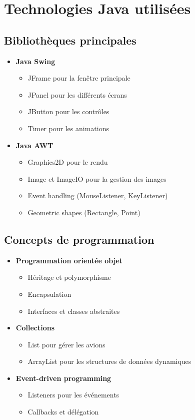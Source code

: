 \documentclass[12pt,a4paper]{article}
\begin{document}
\section{Technologies Java utilisées}

\subsection{Bibliothèques principales}
\begin{itemize}
    \item \textbf{Java Swing}
    \begin{itemize}
        \item JFrame pour la fenêtre principale
        \item JPanel pour les différents écrans
        \item JButton pour les contrôles
        \item Timer pour les animations
    \end{itemize}
    
    \item \textbf{Java AWT}
    \begin{itemize}
        \item Graphics2D pour le rendu
        \item Image et ImageIO pour la gestion des images
        \item Event handling (MouseListener, KeyListener)
        \item Geometric shapes (Rectangle, Point)
    \end{itemize}
\end{itemize}

\subsection{Concepts de programmation}
\begin{itemize}
    \item \textbf{Programmation orientée objet}
    \begin{itemize}
        \item Héritage et polymorphisme
        \item Encapsulation
        \item Interfaces et classes abstraites
    \end{itemize}
    
    \item \textbf{Collections}
    \begin{itemize}
        \item List pour gérer les avions
        \item ArrayList pour les structures de données dynamiques
    \end{itemize}
    
    \item \textbf{Event-driven programming}
    \begin{itemize}
        \item Listeners pour les événements
        \item Callbacks et délégation
    \end{itemize}
\end{itemize}
\end{document}
